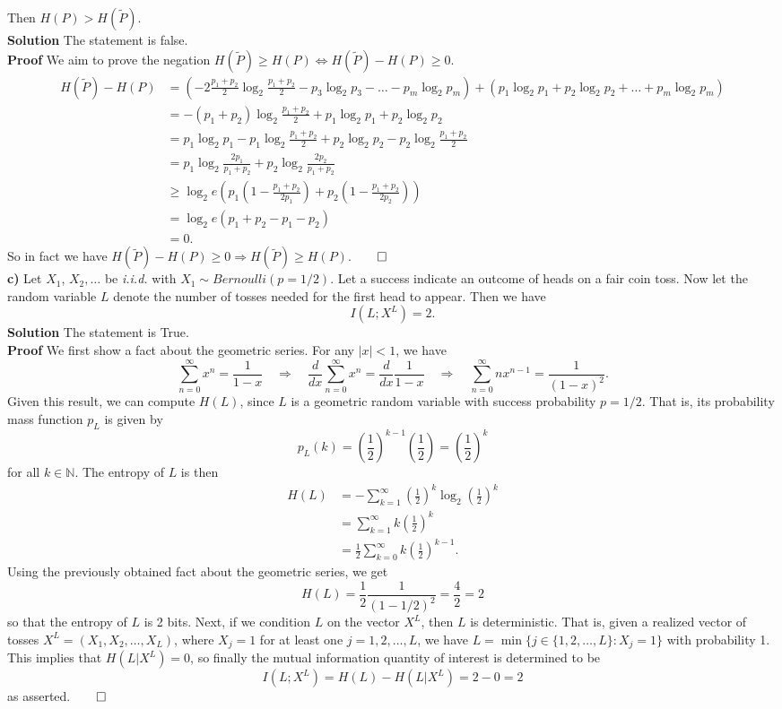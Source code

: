 \documentclass[11pt, letterpaper]{article}
\newcommand{\mbb}[1]{\mathbb{#1}}
\begin{document}
Then $H(P)>H(\tilde{P})$.\\[10pt]
{\bf Solution} The statement is false.\\[10pt]
{\bf Proof} We aim to prove the negation $H(\tilde{P})\geq H(P)\Leftrightarrow H(\tilde{P})-H(P)\geq 0$.
\begin{align*}
    H(\tilde{P})-H(P)&=\left(-2\frac{p_1+p_2}{2}\log_2\frac{p_1+p_2}{2}-p_3\log_2p_3-\dots-p_m\log_2p_m\right)+\left(p_1\log_2p_1+p_2\log_2p_2+\dots+p_m\log_2p_m\right)\\
    &=-(p_1+p_2)\log_2\frac{p_1+p_2}{2}+p_1\log_2p_1+p_2\log_2p_2\\
    &=p_1\log_2p_1-p_1\log_2\frac{p_1+p_2}{2}+p_2\log_2p_2-p_2\log_2\frac{p_1+p_2}{2}\\
    &=p_1\log_2\frac{2p_1}{p_1+p_2}+p_2\log_2\frac{2p_2}{p_1+p_2}\\
    &\geq \log_2e\left(p_1\left(1-\frac{p_1+p_2}{2p_1}\right)+p_2\left(1-\frac{p_1+p_2}{2p_2}\right)\right)\tag{fundamental inequality of the logarithm}\\
    &=\log_2e(p_1+p_2-p_1-p_2)\\
    &=0.
\end{align*}
So in fact we have $H(\tilde{P})-H(P)\geq 0\Rightarrow H(\tilde{P})\geq H(P)$.\hfill{$\qed$}\\[10pt]
{\bf c)} Let $X_1$, $X_2,\dots$ be {\it i.i.d.} with $X_1\sim Bernoulli(p=1/2)$. Let a success indicate an outcome of heads on a fair coin toss. Now let the random variable $L$
denote the number of tosses needed for the first head to appear. Then we have
\[I(L;X^L)=2.\tag{bits}\]
{\bf Solution} The statement is True.\\[10pt]
{\bf Proof} We first show a fact about the geometric series. For any $|x|<1$, we have
\[\sum_{n=0}^\infty x^n=\frac{1}{1-x}\quad\Rightarrow\quad \frac{d}{dx}\sum_{n=0}^\infty x^n=\frac{d}{dx}\frac{1}{1-x}\quad\Rightarrow\quad \sum_{n=0}^\infty nx^{n-1}=\frac{1}{(1-x)^2}.\]
Given this result, we can compute $H(L)$, since $L$ is a geometric random variable with success probability $p=1/2$. That is, its probability mass function $p_L$ is given by
\[p_L(k)=\left(\frac{1}{2}\right)^{k-1}\left(\frac{1}{2}\right)=\left(\frac{1}{2}\right)^k\]
for all $k\in\mbb{N}$. The entropy of $L$ is then
\begin{align*}
    H(L)&=-\sum_{k=1}^\infty \left(\frac{1}{2}\right)^k\log_2\left(\frac{1}{2}\right)^k\\
    &=\sum_{k=1}^\infty k\left(\frac{1}{2}\right)^k\\
    &=\frac{1}{2}\sum_{k=0}^\infty k\left(\frac{1}{2}\right)^{k-1}.
\end{align*}
Using the previously obtained fact about the geometric series, we get
\[H(L)=\frac{1}{2}\frac{1}{(1-1/2)^2}=\frac{4}{2}=2\]
so that the entropy of $L$ is 2 bits. Next, if we condition $L$ on the vector $X^L$, then $L$ is deterministic. That is, given a realized vector of tosses $X^L=(X_1,X_2,\dots,X_L)$,
where $X_j=1$ for at least one $j=1,2,\dots,L$, we have $L=\min\{j\in\{1,2,\dots,L\}: X_j=1\}$ with probability 1. This implies that $H(L|X^L)=0$, so finally the mutual information quantity of interest is determined to be
\[I(L;X^L)=H(L)-H(L|X^L)=2-0=2\]
as asserted.\hfill{$\qed$}
\end{document}
